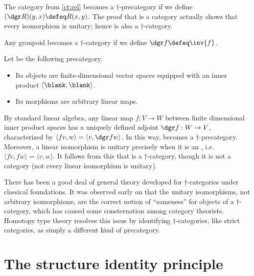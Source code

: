 \begin{eg}\label{ct:rel-dagger-cat}
  The category \urel from \cref{ct:rel} becomes a $\dagger$-pre\-cat\-e\-go\-ry if we define $(\dgr R)(y,x) \defeq R(x,y)$.
  The proof that \urel is a category actually shows that every isomorphism is unitary; hence \urel is also a $\dagger$-category.
\end{eg}

\begin{eg}\label{ct:groupoid-dagger-cat}
  Any groupoid becomes a $\dagger$-category if we define $\dgr f \defeq \inv{f}$.
\end{eg}

\begin{eg}\label{ct:hilb}
  Let \uhilb be the following precategory.
  \begin{itemize}
  \item Its objects are finite-dimensional  vector spaces equipped with an inner product $\langle \blank,\blank\rangle$.
  \item Its morphisms are arbitrary linear maps.
  \end{itemize}
  By standard linear algebra, any linear map $f:V\to W$ between finite
  dimensional inner product spaces has a uniquely defined adjoint $\dgr f:W\to V$, characterized by $\langle f v,w\rangle = \langle v,\dgr f w\rangle$.
  In this way, \uhilb becomes a $\dagger$-precategory.
  Moreover, a linear isomorphism is unitary precisely when it is an ,
  i.e.\ $\langle fv,fw\rangle = \langle v,w\rangle$.
  It follows from this that \uhilb is a $\dagger$-category, though it is not a category (not every linear isomorphism is unitary).
\end{eg}

There has been a good deal of general theory developed for $\dagger$-cat\-e\-gor\-ies under classical foundations.
It was observed early on that the unitary isomorphisms, not arbitrary isomorphisms, are the correct notion of ``sameness'' for objects of a $\dagger$-category, which has caused some consternation among category theorists.
Homotopy type theory resolves this issue by identifying $\dagger$-categories, like strict categories, as simply a different kind of precategory.


\section{The structure identity principle}
\label{sec:sip}

